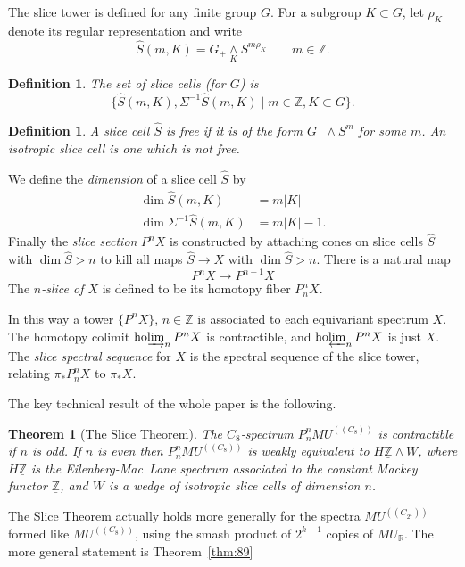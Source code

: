 \documentclass{amsart}
\newtheorem{thm}[equation]{Theorem}
\newtheorem{definition}[equation]{Definition}
\newenvironment{defin}{\begin{definition}\rm}{\end{definition}}
\theoremstyle{definition}
\newtheorem{defin}[equation]{Definition}
\theoremstyle{remark}
\newcommand{\Z}{{\mathbb Z}}
\newcommand{\R}{{\mathbb R}}
\newcommand{\mur}{MU_{\R}}
\newcommand{\mutn}[1]{MU^{(\!(#1)\!)}}
\newcommand{\slc}[2]{P_{#1}^{#1}#2}
\DeclareMathOperator{\ho}{ho}
\newcommand{\smashove}[1]{\underset{#1}{\wedge}}
\newcommand{\Zm}{\underline{\Z}}
\newcommand{\hocolim}{\ho\!\varinjlim}
\newcommand{\holim}{\ho\!\varprojlim}
\newcommand{\ze}{C_{8}}
\newcommand{\slicecell}{\widehat{S}}
\begin{document}
The slice tower is defined for any finite group $G$.  For a subgroup
$K\subset G$, let $\rho_{K}$ denote its regular representation and
write
\[
\slicecell(m,K)=G_{+}\smashove{K}S^{m\rho_{K}}\qquad m\in\Z.
\]

\begin{defin}
\label{def:18} The set of {\em slice cells} (for $G$) is
\[
\{\slicecell(m,K), \Sigma^{-1}\slicecell(m,K)\mid m\in \Z,
K\subset G \}.
\]
\end{defin}

\begin{defin}
\label{def:19}
A slice cell $\slicecell$ is {\em free} if it is of the form $G_{+}\wedge
S^{m}$ for some $m$.  An {\em isotropic} slice cell is one which is not free.
\end{defin}


We define the {\em dimension} of a slice cell $\slicecell$ by
\begin{align*}
\dim \slicecell(m,K) &=m|K| \\
\dim\Sigma^{-1}\slicecell(m,K) &= m |K|-1.
\end{align*}
Finally the {\em slice section} $P^{n}X$ is constructed by attaching
cones on slice cells $\slicecell$ with $\dim \slicecell>n$ to kill all
maps $\slicecell\to X$ with $\dim \slicecell>n$.  There is a natural
map
\[
P^{n}X\to P^{n-1}X
\]
The {\em $n$-slice of $X$} is defined to be its homotopy fiber
$\slc{n}{X}$.

In this way a tower $\{P^{n}X\}$, $n\in \Z$ is associated to each
equivariant spectrum $X$.  The homotopy colimit $\hocolim_{n}P^{n}X$ is
contractible, and $\holim_{n}P^{n}X$ is just $X$.  The {\em slice
spectral sequence} for $X$ is the spectral sequence of the slice
tower, relating $\pi_{\ast}\slc{n}{X}$ to $\pi_{\ast}X$.

The key technical result of the whole paper is the following.

\begin{thm}[The Slice Theorem] 
\label{thm:62} 
The $\ze$-spectrum
$\slc{n}{\mutn{\ze}}$ is contractible if $n$ is odd.  If $n$ is even
then $\slc{n}{\mutn{\ze}}$ is weakly equivalent to $H\Zm\wedge W$, where
$H\Zm$ is the Eilenberg-Mac~Lane spectrum associated to the constant
Mackey functor $\Zm$, and $W$ is a wedge of isotropic slice cells of
dimension $n$.
\end{thm}

The Slice Theorem actually holds more generally for the spectra
$\mutn{C_{2^{k}}}$ formed like $\mutn{\ze}$, using the smash product
of $2^{k-1}$ copies of $\mur$.  The more general statement is
Theorem~\ref{thm:89}
\end{document}

